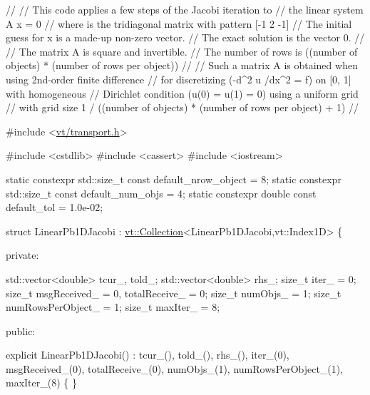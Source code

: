 \begin{DoxyCodeInclude}

\textcolor{comment}{//}
\textcolor{comment}{// This code applies a few steps of the Jacobi iteration to}
\textcolor{comment}{// the linear system  A x = 0}
\textcolor{comment}{// where is the tridiagonal matrix with pattern [-1 2 -1]}
\textcolor{comment}{// The initial guess for x is a made-up non-zero vector.}
\textcolor{comment}{// The exact solution is the vector 0.}
\textcolor{comment}{//}
\textcolor{comment}{// The matrix A is square and invertible.}
\textcolor{comment}{// The number of rows is ((number of objects) * (number of rows per object))}
\textcolor{comment}{//}
\textcolor{comment}{// Such a matrix A is obtained when using 2nd-order finite difference}
\textcolor{comment}{// for discretizing (-d^2 u /dx^2 = f) on [0, 1] with homogeneous}
\textcolor{comment}{// Dirichlet condition (u(0) = u(1) = 0) using a uniform grid}
\textcolor{comment}{// with grid size 1 / ((number of objects) * (number of rows per object) + 1)}
\textcolor{comment}{//}


\textcolor{preprocessor}{#include <\hyperlink{transport_8h}{vt/transport.h}>}

\textcolor{preprocessor}{#include <cstdlib>}
\textcolor{preprocessor}{#include <cassert>}
\textcolor{preprocessor}{#include <iostream>}

\textcolor{keyword}{static} constexpr std::size\_t \textcolor{keyword}{const} default\_nrow\_object = 8;
\textcolor{keyword}{static} constexpr std::size\_t \textcolor{keyword}{const} default\_num\_objs = 4;
\textcolor{keyword}{static} constexpr \textcolor{keywordtype}{double} \textcolor{keyword}{const} default\_tol = 1.0e-02;

\textcolor{keyword}{struct }LinearPb1DJacobi : \hyperlink{structvt_1_1vrt_1_1collection_1_1_collection}{vt::Collection}<LinearPb1DJacobi,vt::Index1D> \{

\textcolor{keyword}{private}:

  std::vector<double> tcur\_, told\_;
  std::vector<double> rhs\_;
  \textcolor{keywordtype}{size\_t} iter\_ = 0;
  \textcolor{keywordtype}{size\_t} msgReceived\_ = 0, totalReceive\_ = 0;
  \textcolor{keywordtype}{size\_t} numObjs\_ = 1;
  \textcolor{keywordtype}{size\_t} numRowsPerObject\_ = 1;
  \textcolor{keywordtype}{size\_t} maxIter\_ = 8;

\textcolor{keyword}{public}:

  \textcolor{keyword}{explicit} LinearPb1DJacobi() :
    tcur\_(), told\_(), rhs\_(), iter\_(0),
    msgReceived\_(0), totalReceive\_(0),
    numObjs\_(1), numRowsPerObject\_(1), maxIter\_(8)
  \{ \}



\end{DoxyCodeInclude}

